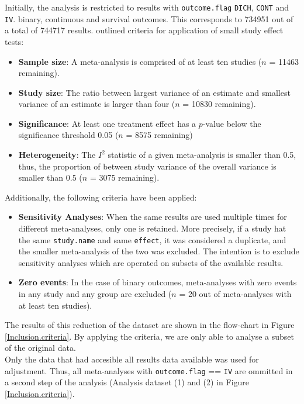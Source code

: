 \documentclass[11pt,a4paper,twoside]{book}\usepackage[]{graphicx}\usepackage[]{color}
\begin{document}
Initially, the analysis is restricted to results with \texttt{outcome.flag} \texttt{DICH}, \texttt{CONT} and \texttt{IV}. binary, continuous and survival outcomes. This corresponds to 734951 out of a total of 744717 results.
\citet{Ioannidis2007} outlined criteria for application of small study effect tests:
\begin{itemize}
\item \textbf{Sample size}: A meta-analysis is comprised of at least ten studies ($n$ = 11463 remaining). 
\item \textbf{Study size}: The ratio between largest variance of an estimate and smallest variance of an estimate is larger than four ($n$ = 10830 remaining).
\item \textbf{Significance}: At least one treatment effect has a $p$-value below the significance threshold 0.05 ($n$ = 8575 remaining)
\item \textbf{Heterogeneity}: The $I^2$ statistic of a given meta-analysis is smaller than 0.5, thus, the proportion of between study variance of the overall variance is smaller than 0.5 ($n$ = 3075 remaining).
\end{itemize}
Additionally, the following criteria have been applied:
\begin{itemize}
\item \textbf{Sensitivity Analyses}: When the same results are used multiple times for different meta-analyses, only one is retained. More precisely, if a study hat the same \texttt{study.name} and same \texttt{effect}, it was considered a duplicate, and the smaller meta-analysis of the two was excluded. The intention is to exclude sensitivity analyses which are operated on subsets of the available results.
\item \textbf{Zero events}: In the case of binary outcomes, meta-analyses with zero events in any study and any group are excluded ($n$ = 20 out of meta-analyses with at least ten studies).
\end{itemize}

The results of this reduction of the dataset are shown in the flow-chart in Figure \ref{Inclusion.criteria}. By applying the criteria, we are only able to analyse a subset of the original data. \\
Only the data that had accesible all results data available was used for adjustment. Thus, all meta-analyses with \texttt{outcome.flag} == \texttt{IV} are ommitted in a second step of the analysis (Analysis dataset (1) and (2) in Figure \ref{Inclusion.criteria}).
\end{document}
